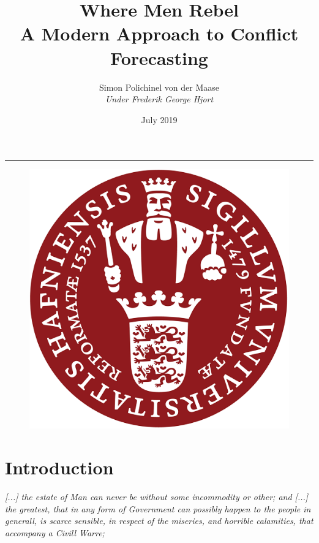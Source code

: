 \documentclass[a4paper]{article}
\title{Where Men Rebel\\A Modern Approach to Conflict Forecasting}
\author{Simon Polichinel von der Maase\\\emph{Under Frederik George Hjort}}
\date{July 2019}
\begin{document}
	\begin{titlepage}
		\maketitle
		\noindent\rule{\linewidth}{0.4pt}
		\begin{figure}[h]
			\centering
			\includegraphics[scale=0.32]{KU_logo.png}
		\end{figure}
		\thispagestyle{empty} %
	\end{titlepage}
    \tableofcontents
\pagebreak

\begin{abstract}

\end{abstract}
\pagebreak

\section{Introduction}

\begin{displayquote}
\emph{[...] the estate of Man can never be without some incommodity or other; and [...] the greatest, that in any form of Government can possibly happen to the people in generall, is scarce sensible, in respect of the miseries, and horrible calamities, that accompany a Civill Warre;} \cite[128]{Hobbes_1991}\par
\end{displayquote}
\end{document}
